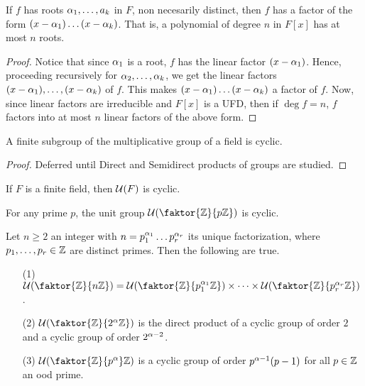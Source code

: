 \begin{theorem}\label{3.4.4}
    If $f$ has roots  $\alpha_1, \dots, a_k$ in $F$, non necesarily distinct, then
    $f$ has a factor of the form $(x-\alpha_1) \dots (x-\alpha_k)$. That is, a
    polynomial of degree $n$ in  $F[x]$ has at most $n$ roots.
\end{theorem}
\begin{proof}
    Notice that since $\alpha_1$ is a root, $f$ has the linear factor  $(x-\alpha_1)$.
    Hence, proceeding recursively for $\alpha_2, \dots, \alpha_k$, we get the linear
    factors $(x-\alpha_1), \dots, (x-\alpha_k)$ of $f$. This makes  $(x-\alpha_1) \dots
    (x-\alpha_k)$ a factor of $f$. Now, since linear factors are irreducible and
    $F[x]$ is a UFD, then if $\deg{f}=n$, $f$ factors into at most  $n$ linear
    factors of the above form.
\end{proof}

\begin{lemma}\label{3.4.5}
    A finite subgroup of the multiplicative group of a field is cyclic.
\end{lemma}
\begin{proof}
    Deferred until Direct and Semidirect products of groups are studied.
\end{proof}
\begin{corollary}
    If $F$ is a finite field, then  $\mathcal{U}(F)$ is cyclic.
\end{corollary}
\begin{corollary}
    For any prime $p$, the unit group  $\Uc(\faktor{\Z}{p\Z})$ is cyclic.
\end{corollary}
\begin{corollary}
    Let $n \geq 2$ an integer with  $n=p_1^{\alpha_1} \dots p_r^{\alpha_r}$ its unique
    factorization, where $p_1, \dots, p_r \in \mathbb{Z}$ are distinct primes. Then the
    following are true.
    \begin{enumerate}
        \item[(1)] $\Uc(\faktor{\Z}{n\Z})=\Uc(\faktor{\Z}{p_1^{\a_1}\Z}) \times
            \dots \times \Uc(\faktor{\Z}{p_r^{\a_r}\Z})$.

        \item[(2)] $\Uc(\faktor{\Z}{2^\a\Z})$ is the direct product of a cyclic
            group of order $2$ and a cyclic group of order $2^{\alpha-2}$.

        \item[(3)] $\Uc(\faktor{\Z}{p^\a}\Z)$ is a cyclic group of order
            $p^{\alpha-1}(p-1)$ for all $p \in \mathbb{Z}$ an ood prime.
    \end{enumerate}
\end{corollary}
